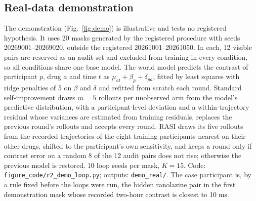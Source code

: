 \documentclass[11pt,a4paper]{article}
\begin{document}
\subsection{Real-data demonstration}
The demonstration (Fig.~\ref{fig:demo}) is illustrative and tests no registered hypothesis. It uses 20 masks generated by the registered procedure with seeds 20269001--20269020, outside the registered 20261001--20261050. In each, 12 visible pairs are reserved as an audit set and excluded from training in every condition, so all conditions share one base model. The world model predicts the contrast of participant $p$, drug $a$ and time $t$ as $\mu_{at}+\beta_p+\delta_{pa}$, fitted by least squares with ridge penalties of 5 on $\beta$ and $\delta$ and refitted from scratch each round. Standard self-improvement draws $m=5$ rollouts per unobserved arm from the model's predictive distribution, with a participant-level deviation and a within-trajectory residual whose variances are estimated from training residuals, replaces the previous round's rollouts and accepts every round. RASI draws its five rollouts from the recorded trajectories of the eight training participants nearest on their other drugs, shifted to the participant's own sensitivity, and keeps a round only if contrast error on a random 8 of the 12 audit pairs does not rise; otherwise the previous model is restored. 10 loop seeds per mask, $K=15$. Code: \texttt{figure\_code/r2\_demo\_loop.py}; outputs: \texttt{demo\_real/}. The case participant is, by a rule fixed before the loops were run, the hidden ranolazine pair in the first demonstration mask whose recorded two-hour contrast is closest to 10 ms.
\end{document}
